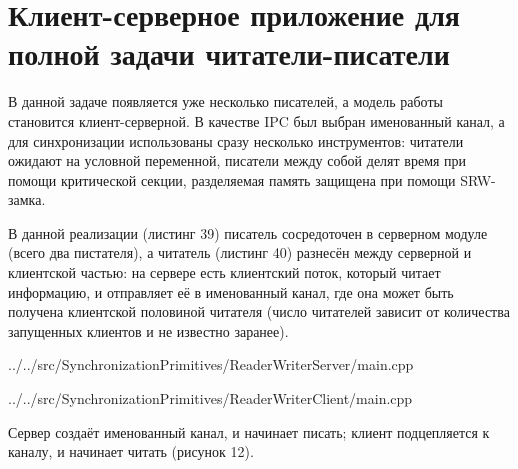 \documentclass[a4paper, 12pt]{article}		%
\begin{document}
\newpage
\section{Клиент-серверное приложение для полной задачи читатели-писатели}

В данной задаче появляется уже несколько писателей, а модель работы становится клиент-серверной. В качестве IPC был выбран именованный канал, а для синхронизации использованы сразу несколько инструментов: читатели ожидают на условной переменной, писатели между собой делят время при помощи критической секции, разделяемая память защищена при помощи SRW-замка.

В данной реализации (листинг 39) писатель сосредоточен в серверном модуле (всего два пистателя), а читатель (листинг 40) разнесён между серверной и клиентской частью: на сервере есть клиентский поток, который читает информацию, и отправляет её в именованный канал, где она может быть получена клиентской половиной читателя (число читателей зависит от количества запущенных клиентов и не известно заранее).


{../../src/SynchronizationPrimitives/ReaderWriterServer/main.cpp}



{../../src/SynchronizationPrimitives/ReaderWriterClient/main.cpp}

Сервер создаёт именованный канал, и начинает писать; клиент подцепляется к каналу, и начинает читать (рисунок 12).
\end{document}
